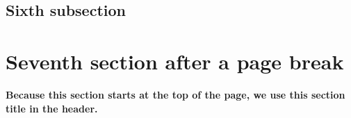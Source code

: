 \documentclass{article}
\begin{document}
\medskip

\lipsum[1-6]

\subsection{Sixth subsection}

\lipsum[7]

\newpage
\section{Seventh section after a page break}
\label{sec:newpage}

{\bfseries Because this section starts at the top of the page, we use this section title in the header.}

\medskip

\lipsum[8-10]
\end{document}
